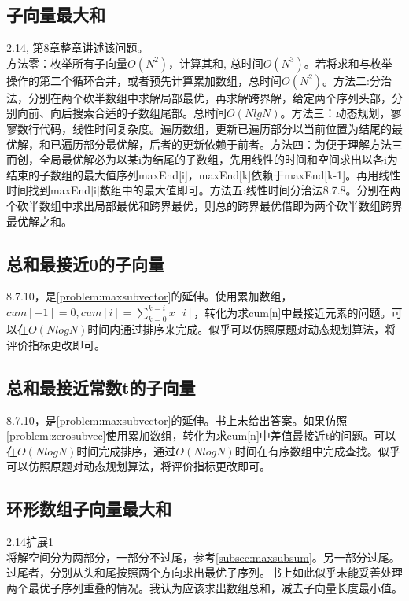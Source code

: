 \subsection{子向量最大和}
\cite{bop}2.14, \cite{pp}第8章整章讲述该问题。\label{problem:maxsubvector}\\
方法零：枚举所有子向量$O(N^2)$，计算其和, 总时间$O(N^3)$。若将求和与枚举操作的第二个循环合并，或者预先计算累加数组，总时间$O(N^2)$。方法二:分治法，分别在两个砍半数组中求解局部最优，再求解跨界解，给定两个序列头部，分别向前、向后搜索合适的子数组尾部。总时间$O(NlgN)$。方法三：动态规划，寥寥数行代码，线性时间复杂度。遍历数组，更新已遍历部分以当前位置为结尾的最优解，和已遍历部分最优解，后者的更新依赖于前者。方法四：\cite{self}为便于理解方法三而创，全局最优解必为以某i为结尾的子数组，先用线性的时间和空间求出以各i为结束的子数组的最大值序列maxEnd[i]，maxEnd[k]依赖于maxEnd[k-1]。再用线性时间找到maxEnd[i]数组中的最大值即可。方法五:线性时间分治法\cite{pp}8.7.8。分别在两个砍半数组中求出局部最优和跨界最优，则总的跨界最优借即为两个砍半数组跨界最优解之和。
\label{subsec:maxsubsum}

\subsection{总和最接近0的子向量}
\cite{pp}8.7.10，是\ref{problem:maxsubvector}的延伸。使用累加数组，$cum[-1]=0,cum[i]=\sum_{k=0}^{k=i}{x[i]}$，转化为求cum[n]中最接近元素的问题。可以在$O(NlogN)$时间内通过排序来完成。似乎可以仿照原题对动态规划算法，将评价指标更改即可。\label{problem:zerosubvec}

\subsection{总和最接近常数t的子向量}
\cite{pp}8.7.10，是\ref{problem:maxsubvector}的延伸。书上未给出答案。如果仿照\ref{problem:zerosubvec}使用累加数组，转化为求cum[n]中差值最接近t的问题。可以在$O(NlogN)$时间完成排序，通过$O(NlogN)$时间在有序数组中完成查找。似乎可以仿照原题对动态规划算法，将评价指标更改即可。

\subsection{环形数组子向量最大和}
\cite{bop}2.14扩展1\\
将解空间分为两部分，一部分不过尾，参考\ref{subsec:maxsubsum}。另一部分过尾。过尾者，分别从头和尾按照两个方向求出最优子序列。书上如此似乎未能妥善处理两个最优子序列重叠的情况。我认为应该求出数组总和，减去子向量长度最小值。

